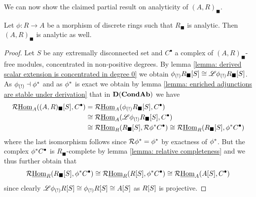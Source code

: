 We can now show the claimed partial result on analyticity of $(A, R)_\blacksquare$.
\begin{lemma}
	\label{lemma: partial analyticity of (A, R)black}
	
	Let $\phi\colon R\to A$ be a morphism of discrete rings such that $R_\blacksquare$ is analytic. Then $(A, R)_\blacksquare$ is analytic as well.
\end{lemma}
\begin{proof}
	Let $S$ be any extremally disconnected set and $C^\bullet$ a complex of $(A, R)_\blacksquare$-free modules, concentrated in non-positive degrees. By lemma \ref{lemma: derived scalar extension is concentrated in degree 0} we obtain ${\phi_{(!)}}{R_\blacksquare[S]} \cong \mathscr{L}{\phi_{(!)}}{R_\blacksquare[S]}$. As ${\phi_{(!)}}\dashv {\phi^\ast}$ and as ${\phi^\ast}$ is exact we obtain by lemma \ref{lemma: enriched adjunctions are stable under derivation} that in ${{\mathbf{D}}({{{\mathbf{Cond}}}{{\mathbf{Ab}}}})}$ we have
	\begin{align*}
		\mathcal{R}{\underline{\operatorname{Hom}}}_A({(A,R)_\blacksquare[S]}, C^\bullet)
		&= \mathcal{R}{\underline{\operatorname{Hom}}}_A({\phi_{(!)}}{R_\blacksquare[S]}, C^\bullet)\\
		&\cong \mathcal{R}{\underline{\operatorname{Hom}}}_A(\mathscr{L}{\phi_{(!)}}{R_\blacksquare[S]}, C^\bullet)\\
		&\cong\mathcal{R}{\underline{\operatorname{Hom}}}_R({R_\blacksquare[S]}, \mathcal{R}{\phi^\ast}C^\bullet) \cong \mathcal{R}{\underline{\operatorname{Hom}}}_R({R_\blacksquare[S]},{\phi^\ast}C^\bullet)
	\end{align*}
	where the last isomorphism follows since $\mathcal{R}{\phi^\ast} = {\phi^\ast}$ by exactness of ${\phi^\ast}$. But the complex ${\phi^\ast}C^\bullet$ is $R_\blacksquare$-complete by lemma \ref{lemma: relative completeness} and we thus further obtain that
		$$\mathcal{R}{\underline{\operatorname{Hom}}}_R({R_\blacksquare[S]},{\phi^\ast}C^\bullet) \cong \mathcal{R}{\underline{\operatorname{Hom}}}_R({R[S]}, {\phi^\ast}C^\bullet)\cong \mathcal{R}{\underline{\operatorname{Hom}}}_A({A[S]}, C^\bullet)$$
	since clearly $\mathscr{L}{\phi_{(!)}}{R[S]} \cong {\phi_{(!)}}{R[S]} \cong {A[S]}$ as ${R[S]}$ is projective.
\end{proof}

